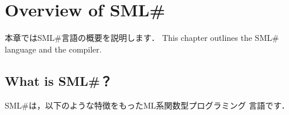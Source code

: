 \documentclass{jbook}
\newcommand{\txt}[2]{#2}
\newcommand{\smlsharp}{SML\#}
\begin{document}
\chapter{\txt{\smlsharp{}の概要}{Overview of \smlsharp{}}}
\label{chap:intro}
\ifjp%
本章では\smlsharp{}言語の概要を説明します．
\else%
This chapter outlines the \smlsharp{} language and the compiler.
\fi%

\section{\txt{\smlsharp{}とは？}{What is \smlsharp{}？}}
\label{sec:whatIsSmlsharp}
\ifjp%
	\smlsharp{}は，以下のような特徴をもったML系関数型プログラミング
言語です．
\end{document}
